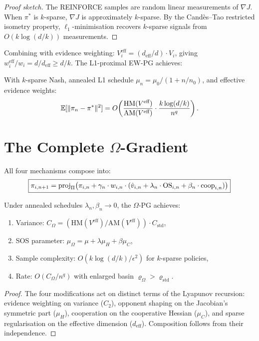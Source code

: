 \begin{proof}[Proof sketch]
The REINFORCE samples are random linear measurements of $\nabla J$. When $\pi^*$ is $k$-sparse, $\nabla J$ is approximately $k$-sparse. By the Cand\`es--Tao restricted isometry property, $\ell_1$-minimisation recovers $k$-sparse signals from $O(k \log(d/k))$ measurements.
\end{proof}

Combining with evidence weighting: $V_i^{\text{eff}} = (d_{\text{eff}}/d) \cdot V_i$, giving $w_i^{\text{eff}}/w_i = d/d_{\text{eff}} \geq d/k$. The L1-proximal EW-PG achieves:

\begin{theorem}
\label{thm:sparse-ewpg-ch3}
With $k$-sparse Nash, annealed L1 schedule $\mu_n = \mu_0/(1+n/n_0)$, and effective evidence weights:
\begin{equation}
    \mathbb{E}[\|\pi_n - \pi^*\|^2] = O\!\left(\frac{\text{HM}(V^{\text{eff}})}{\text{AM}(V^{\text{eff}})} \cdot \frac{k \log(d/k)}{n^q}\right).
\end{equation}
\end{theorem}


\section{The Complete $\Omega$-Gradient}
\label{sec:omega}

All four mechanisms compose into:
\begin{equation}
\label{eq:omega-ch3}
\boxed{
    \pi_{i,n+1} = \operatorname{proj}_\Pi\bigl(\pi_{i,n} + \gamma_n \cdot w_{i,n} \cdot (\hat{v}_{i,n} + \lambda_n \cdot \text{OS}_{i,n} + \beta_n \cdot \text{coop}_{i,n})\bigr)
}
\end{equation}

\begin{theorem}
\label{thm:omega-ch3}
Under annealed schedules $\lambda_n, \beta_n \to 0$, the $\Omega$-PG achieves:
\begin{enumerate}[label=(\roman*)]
    \item Variance: $C_\Omega = (\text{HM}(V^{\text{eff}})/\text{AM}(V^{\text{eff}})) \cdot C_{\text{std}}$,
    \item SOS parameter: $\mu_\Omega = \mu + \lambda\mu_H + \beta\mu_C$,
    \item Sample complexity: $O(k \log(d/k) / \epsilon^2)$ for $k$-sparse policies,
    \item Rate: $O(C_\Omega / n^q)$ with enlarged basin $\varrho_\Omega > \varrho_{\text{std}}$.
\end{enumerate}
\end{theorem}

\begin{proof}
The four modifications act on distinct terms of the Lyapunov recursion: evidence weighting on variance ($C_2$), opponent shaping on the Jacobian's symmetric part ($\mu_H$), cooperation on the cooperative Hessian ($\mu_C$), and sparse regularisation on the effective dimension ($d_{\text{eff}}$). Composition follows from their independence.
\end{proof}
